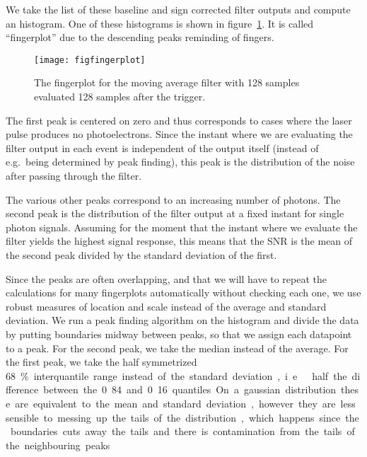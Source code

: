We take the list of these baseline and sign corrected filter outputs and
compute an histogram. One of these histograms is shown in
figure~\ref{fig:fingerplot}. It is called ``fingerplot'' due to the descending
peaks reminding of fingers.

\begin{figure}
    \hspace{0.00\textwidth}
    \texttt{[image: figfingerplot]}
    
    \caption{The fingerplot for the moving average filter with 128 samples
    evaluated 128 samples after the trigger.}
    
    \label{fig:fingerplot}
\end{figure}

The first peak is centered on zero and thus corresponds to cases where the
laser pulse produces no photoelectrons. Since the instant where we are
evaluating the filter output in each event is independent of the output itself
(instead of e.g.\ being determined by peak finding), this peak is the
distribution of the noise after passing through the filter.

The various other peaks correspond to an increasing number of photons. The
second peak is the distribution of the filter output at a fixed instant for
single photon signals. Assuming for the moment that the instant where we
evaluate the filter yields the highest signal response, this means that the SNR
is the mean of the second peak divided by the standard deviation of the first.

Since the peaks are often overlapping, and that we will have to repeat the
calculations for many fingerplots automatically without checking each one, we
use robust measures of location and scale instead of the average and standard
deviation. We run a peak finding algorithm on the histogram and divide the data
by putting boundaries midway between peaks, so that we assign each datapoint to
a peak. For the second peak, we take the median instead of the average. For the
first peak, we take the half symmetrized \SI{68}\% interquantile range instead
of the standard deviation, i.e.\ half the difference between the 0.84 and 0.16
quantiles. On a gaussian distribution these are equivalent to the mean and
standard deviation, however they are less sensible to messing up the tails of
the distribution, which happens since the boundaries cuts away the tails and
there is contamination from the tails of the neighbouring peaks.


